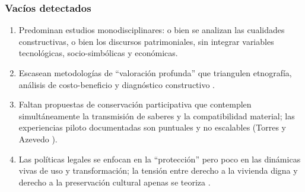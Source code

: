 \subsubsection{Vacíos detectados}

\begin{enumerate}
	\item Predominan estudios monodisciplinares: o bien se analizan las cualidades constructivas, o bien los discursos patrimoniales, sin integrar variables tecnológicas, socio-simbólicas y económicas.

	\item Escasean metodologías de ``valoración profunda'' que triangulen etnografía, análisis de costo-beneficio y diagnóstico constructivo \citep{delatorre2002values}.

	\item Faltan propuestas de conservación participativa que contemplen simultáneamente la transmisión de saberes y la compatibilidad material; las experiencias piloto documentadas son puntuales y no escalables (Torres y Azevedo \citeyear{torres2021transmision}).

	\item Las políticas legales se enfocan en la ``protección'' pero poco en las dinámicas vivas de uso y transformación; la tensión entre derecho a la vivienda digna y derecho a la preservación cultural apenas se teoriza \citep{herrejon1994}.
\end{enumerate}
